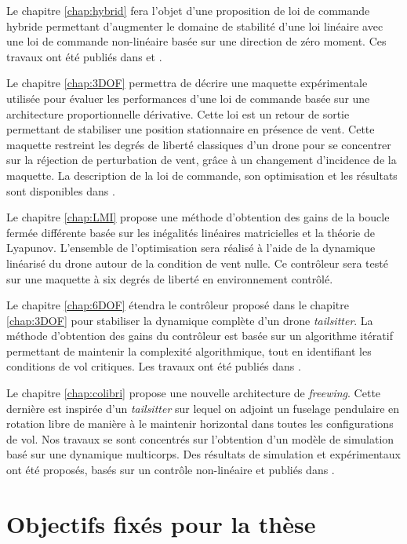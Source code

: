 Le chapitre \ref{chap:hybrid} fera l'objet d'une proposition de loi de commande hybride permettant d'augmenter le domaine de stabilité d'une loi linéaire avec une loi de commande non-linéaire basée sur une direction de zéro moment. Ces travaux ont été publiés dans  \cite{sansouStage} et \cite{sansouECC}.

Le chapitre \ref{chap:3DOF} permettra de décrire une maquette expérimentale utilisée pour évaluer les performances d'une loi de commande basée sur une architecture proportionnelle dérivative. Cette loi est un retour de sortie permettant de stabiliser une position stationnaire en présence de vent. Cette maquette restreint les degrés de liberté classiques d'un drone pour se concentrer sur la réjection de perturbation de vent, grâce à un changement d'incidence de la maquette. La description de la loi de commande, son optimisation et les résultats sont disponibles dans \cite{SANSOUACA}.

Le chapitre \ref{chap:LMI} propose une méthode d'obtention des gains de la boucle fermée différente basée sur les inégalités linéaires matricielles et la théorie de Lyapunov. L'ensemble de l'optimisation sera réalisé à l'aide de la dynamique linéarisé du drone autour de la condition de vent nulle. Ce contrôleur sera testé sur une maquette à six degrés de liberté en environnement contrôlé.

Le chapitre \ref{chap:6DOF} étendra le contrôleur proposé dans le chapitre \ref{chap:3DOF} pour stabiliser la dynamique complète d'un drone \textit{tailsitter}. La méthode d'obtention des gains du contrôleur est basée sur un algorithme itératif permettant de maintenir la complexité algorithmique, tout en identifiant les conditions de vol critiques. Les travaux ont été publiés dans \cite{sansouTCST}.

Le chapitre \ref{chap:colibri} propose une nouvelle architecture de \textit{freewing}. Cette dernière est inspirée d'un \textit{tailsitter} sur lequel on adjoint un fuselage pendulaire en rotation libre de manière à le maintenir horizontal dans toutes les configurations de vol. Nos travaux se sont concentrés sur l'obtention d'un modèle de simulation basé sur une dynamique multicorps. Des résultats de simulation et expérimentaux ont été proposés, basés sur un contrôle non-linéaire et publiés dans \cite{sansouICUAS}.


\section*{Objectifs fixés pour la thèse}

